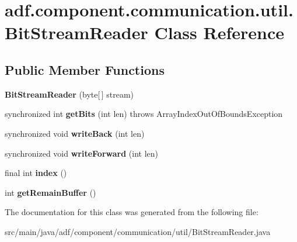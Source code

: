 \hypertarget{classadf_1_1component_1_1communication_1_1util_1_1BitStreamReader}{}\section{adf.\+component.\+communication.\+util.\+Bit\+Stream\+Reader Class Reference}
\label{classadf_1_1component_1_1communication_1_1util_1_1BitStreamReader}
\subsection*{Public Member Functions}
\begin{DoxyCompactItemize}
\item 
\hypertarget{classadf_1_1component_1_1communication_1_1util_1_1BitStreamReader_aa675e7b62cbb86353d35e4501ce747a0}{}\label{classadf_1_1component_1_1communication_1_1util_1_1BitStreamReader_aa675e7b62cbb86353d35e4501ce747a0} 
{\bfseries Bit\+Stream\+Reader} (byte\mbox{[}$\,$\mbox{]} stream)
\item 
\hypertarget{classadf_1_1component_1_1communication_1_1util_1_1BitStreamReader_a35fa945440eb8d7020c719e1505b9e8d}{}\label{classadf_1_1component_1_1communication_1_1util_1_1BitStreamReader_a35fa945440eb8d7020c719e1505b9e8d} 
synchronized int {\bfseries get\+Bits} (int len)  throws Array\+Index\+Out\+Of\+Bounds\+Exception 
\item 
\hypertarget{classadf_1_1component_1_1communication_1_1util_1_1BitStreamReader_a86348d3f5ae3521b1b926d08b1ce4999}{}\label{classadf_1_1component_1_1communication_1_1util_1_1BitStreamReader_a86348d3f5ae3521b1b926d08b1ce4999} 
synchronized void {\bfseries write\+Back} (int len)
\item 
\hypertarget{classadf_1_1component_1_1communication_1_1util_1_1BitStreamReader_a9900873881f74452fd57a0ced23358de}{}\label{classadf_1_1component_1_1communication_1_1util_1_1BitStreamReader_a9900873881f74452fd57a0ced23358de} 
synchronized void {\bfseries write\+Forward} (int len)
\item 
\hypertarget{classadf_1_1component_1_1communication_1_1util_1_1BitStreamReader_ac2591f38dbbd31feeea3fbfcce95478b}{}\label{classadf_1_1component_1_1communication_1_1util_1_1BitStreamReader_ac2591f38dbbd31feeea3fbfcce95478b} 
final int {\bfseries index} ()
\item 
\hypertarget{classadf_1_1component_1_1communication_1_1util_1_1BitStreamReader_aac24549335f0248ac12dd8861e5dd426}{}\label{classadf_1_1component_1_1communication_1_1util_1_1BitStreamReader_aac24549335f0248ac12dd8861e5dd426} 
int {\bfseries get\+Remain\+Buffer} ()
\end{DoxyCompactItemize}


The documentation for this class was generated from the following file\+:\begin{DoxyCompactItemize}
\item 
src/main/java/adf/component/communication/util/Bit\+Stream\+Reader.\+java\end{DoxyCompactItemize}
